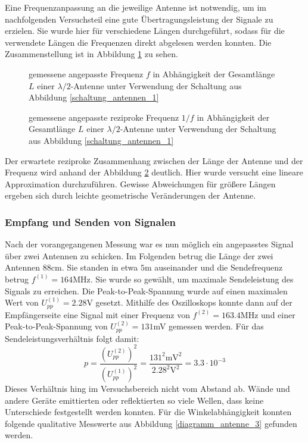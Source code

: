 		Eine Frequenzanpassung an die jeweilige Antenne ist notwendig, um im nachfolgenden Versuchsteil eine gute Übertragungsleistung der Signale zu erzielen.
		Sie wurde hier für verschiedene Längen durchgeführt, sodass für die verwendete Längen die Frequenzen direkt abgelesen werden konnten.
		Die Zusammenstellung ist in Abbildung \ref{diagramm_antenne_1} zu sehen.

		\begin{figure}[H]
			\center
			
			\caption{\centering gemessene angepasste Frequenz $f$ in Abhängigkeit der Gesamtlänge $L$ einer $\lambda/2$-Antenne unter Verwendung der Schaltung aus Abbildung \ref{schaltung_antennen_1}}
			\label{diagramm_antenne_1}
		\end{figure}

		\begin{figure}[H]
			\center
			
			\caption{\centering gemessene angepasste reziproke Frequenz $1/f$ in Abhängigkeit der Gesamtlänge $L$ einer $\lambda/2$-Antenne unter Verwendung der Schaltung aus Abbildung \ref{schaltung_antennen_1}}
			\label{diagramm_antenne_2}
		\end{figure}

		Der erwartete reziproke Zusammenhang zwischen der Länge der Antenne und der Frequenz wird anhand der Abbildung \ref{diagramm_antenne_2} deutlich.
		Hier wurde versucht eine lineare Approximation durchzuführen.
		Gewisse Abweichungen für größere Längen ergeben sich durch leichte geometrische Veränderungen der Antenne.


	\subsubsection{Empfang und Senden von Signalen} %
	\label{ssub:empfang_und_senden_von_signalen}
	
		Nach der vorangegangenen Messung war es nun möglich ein angepasstes Signal über zwei Antennen zu schicken.
		Im Folgenden betrug die Länge der zwei Antennen $88$cm. 
		Sie standen in etwa $5$m auseinander und die Sendefrequenz betrug $f^{(1)} = 164$MHz.
		Sie wurde so gewählt, um maximale Sendeleistung des Signals zu erreichen.
		Die Peak-to-Peak-Spannung wurde auf einen maximalen Wert von $U_{pp}^{(1)} = 2.28$V gesetzt.
		Mithilfe des Oszilloskops konnte dann auf der Empfängerseite eine Signal mit einer Frequenz von $f^{(2)} = 163.4$MHz und einer Peak-to-Peak-Spannung von $U^{(2)}_{pp} = 131$mV gemessen werden.
		Für das Sendeleistungsverhältnis folgt damit:
		\[
			p = \dfrac{\left(U^{(2)}_{pp}\right)^2}{\left(U^{(1)}_{pp}\right)^2} = \dfrac{131^2\text{mV}^2}{2.28^2\text{V}^2} = 3.3\cdot 10^{-3}
		\]
		Dieses Verhältnis hing im Versuchsbereich nicht vom Abstand ab.
		Wände und andere Geräte emittierten oder reflektierten so viele Wellen, dass keine Unterschiede festgestellt werden konnten.
		Für die Winkelabhängigkeit konnten folgende qualitative Messwerte aus Abbildung \ref{diagramm_antenne_3} gefunden werden.

